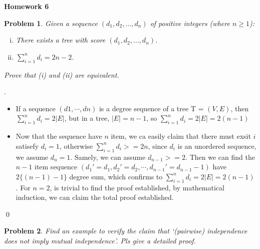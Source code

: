 \documentclass[12pt]{article}
\date{Feb 14, 2012}
\newtheorem{hw}{Problem}
\newenvironment{sol}
  {\par\vspace{3mm}\noindent{\it Solution}.}
  {\qed}
\begin{document}
\begin{center}
{\LARGE\bf Homework 6}\\
\vspace{2mm}
\end{center}
\begin{hw}
Given a sequence $(d_1, d_2, \ldots, d_n)$ of  positive integers (where $n\geq 1$):
\begin{enumerate}[(i)]
  \item There exists a tree with score $(d_1, d_2, \ldots, d_n)$.
  \item $\sum_{i=1}^{n}d_i=2n-2$.
\end{enumerate}
Prove that (i) and (ii) are equivalent.
\end{hw}

\begin{sol}\par
\renewcommand{\qedsymbol}{}
\begin{itemize}
 \item If a sequence $(d1,\cdots,dn)$ is a degree sequence of a tree T = $(V, E)$, then $\sum_{i=1}^n d_i = 2|E|$, but in a tree, $|E| = n - 1$, so $\sum_{i=1}^n d_i = 2|E| = 2(n - 1)$
 \item Now that the sequence have $n$ item, we ca easily claim that there must exsit $i$ satisefy $d_i=1$, otherwise $\sum_{i=1}^n d_i >= 2n$, since $d_i$ is an unordered sequence, we assume $d_n = 1$. Samely, we can assume $d_{n-1} >=2$. Then we can find the $n-1$ item sequence $(d_1'=d_1, d_2'=d_2, \cdots,d_{n-1}'=d_{n-1}-1)$ have $2\{(n-1)-1\}$ degree sum, which confirms to $\sum_{i=1}^n d_i = 2|E| = 2(n - 1)$. For $n = 2$, is trivial to find the proof established, by mathematical induction, we can claim the total proof established.
 \end{itemize}
\end{sol}

\begin{hw}
Find an example to verify the claim that `(pairwise) independence does not  imply mutual independence'. Pls give a detailed proof.
\end{hw}
\end{document}
